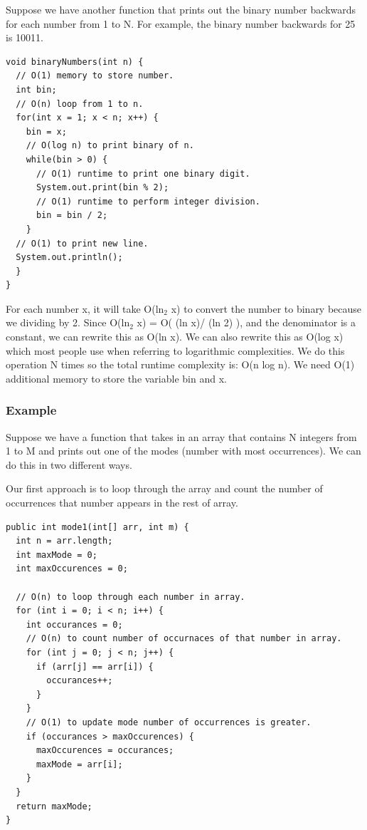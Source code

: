 \documentclass[11pt,oneside]{book}
\begin{document}
Suppose we have another function that prints out the binary number backwards for each number from 1 to N. For example, the binary number backwards for 25 is 10011.

\begin{lstlisting}
void binaryNumbers(int n) {
  // O(1) memory to store number.
  int bin;
  // O(n) loop from 1 to n.
  for(int x = 1; x < n; x++) {
    bin = x;
    // O(log n) to print binary of n.
    while(bin > 0) {
      // O(1) runtime to print one binary digit.
      System.out.print(bin % 2);
      // O(1) runtime to perform integer division.
      bin = bin / 2; 
    }
  // O(1) to print new line.
  System.out.println();
  }
}
\end{lstlisting}

For each number x, it will take O(ln$_{2}$ x) to convert the number to binary because we dividing by 2. Since O(ln$_{2}$ x) = O( (ln x)/ (ln 2) ), and the denominator is a constant, we can rewrite this as O(ln x). We can also rewrite this as O(log x) which most people use when referring to logarithmic complexities. We do this operation N times so the total runtime complexity is: O(n log n). We need O(1) additional memory to store the variable bin and x.

\subsubsection{Example}

Suppose we have a function that takes in an array that contains N integers from 1 to M and prints out one of the modes (number with most occurrences). We can do this in two different ways.

Our first approach is to loop through the array and count the number of occurrences that number appears in the rest of array.

\begin{lstlisting}
public int mode1(int[] arr, int m) {
  int n = arr.length;
  int maxMode = 0;
  int maxOccurences = 0;
  
  // O(n) to loop through each number in array.
  for (int i = 0; i < n; i++) {
    int occurances = 0;
    // O(n) to count number of occurnaces of that number in array.
    for (int j = 0; j < n; j++) {
      if (arr[j] == arr[i]) {
        occurances++;
      }
    }
    // O(1) to update mode number of occurrences is greater. 
    if (occurances > maxOccurences) {
      maxOccurences = occurances;
      maxMode = arr[i];
    }
  }
  return maxMode;
}
\end{lstlisting}
\end{document}
